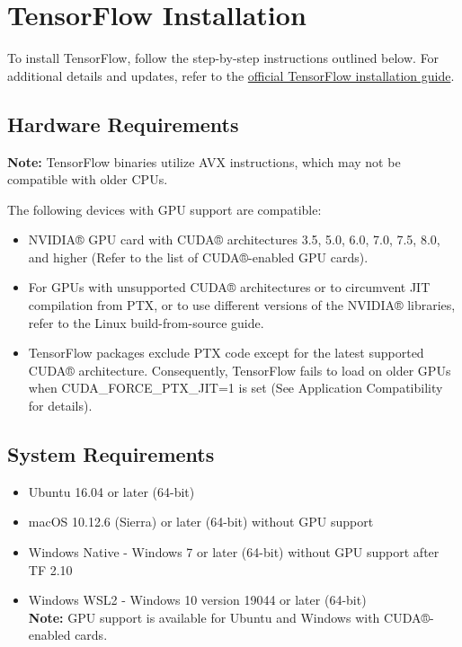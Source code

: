 \section{TensorFlow Installation}

To install TensorFlow, follow the step-by-step instructions outlined below. For additional details and updates, refer to the \href{https://www.tensorflow.org/install/pip}{official TensorFlow installation guide}.


\subsection{Hardware Requirements}

\textbf{Note:} TensorFlow binaries utilize AVX instructions, which may not be compatible with older CPUs.

The following devices with GPU support are compatible:

\begin{itemize}
	\item NVIDIA® GPU card with CUDA® architectures 3.5, 5.0, 6.0, 7.0, 7.5, 8.0, and higher (Refer to the list of CUDA®-enabled GPU cards).
	\item For GPUs with unsupported CUDA® architectures or to circumvent JIT compilation from PTX, or to use different versions of the NVIDIA® libraries, refer to the Linux build-from-source guide.
	\item TensorFlow packages exclude PTX code except for the latest supported CUDA® architecture. Consequently, TensorFlow fails to load on older GPUs when CUDA\_FORCE\_PTX\_JIT=1 is set (See Application Compatibility for details).
\end{itemize}

\subsection{System Requirements}

\begin{itemize}
	\item Ubuntu 16.04 or later (64-bit)
	\item macOS 10.12.6 (Sierra) or later (64-bit) without GPU support
	\item Windows Native - Windows 7 or later (64-bit) without GPU support after TF 2.10
	\item Windows WSL2 - Windows 10 version 19044 or later (64-bit)\\
	\textbf{Note:} GPU support is available for Ubuntu and Windows with CUDA®-enabled cards.
\end{itemize}

